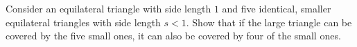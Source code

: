 Consider an equilateral triangle with side length $1$ and five identical,
smaller equilateral triangles with side length $s<1$. 
Show that if the large triangle can be covered by the five small ones,
it can also be covered by four of the small ones.